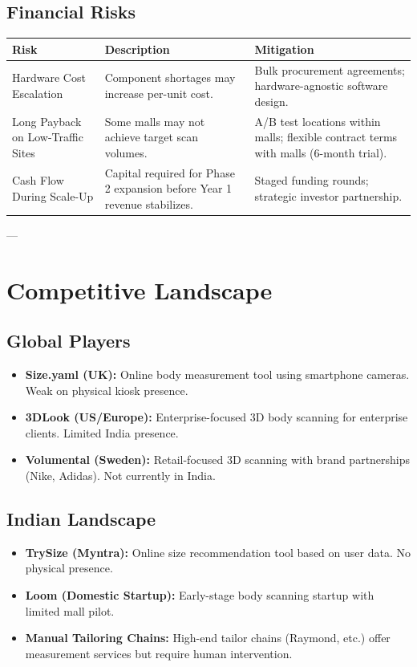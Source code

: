 \documentclass[12pt,a4paper]{article}
\begin{document}
\subsection{Financial Risks}

\begin{tabular}{lp{6cm}p{3cm}}
\toprule
Risk & Description & Mitigation \\
\midrule
Hardware Cost Escalation & Component shortages may increase per-unit cost. & Bulk procurement agreements; hardware-agnostic software design. \\
Long Payback on Low-Traffic Sites & Some malls may not achieve target scan volumes. & A/B test locations within malls; flexible contract terms with malls (6-month trial). \\
Cash Flow During Scale-Up & Capital required for Phase 2 expansion before Year 1 revenue stabilizes. & Staged funding rounds; strategic investor partnership. \\
\midrule
\end{tabular}

---

\section{Competitive Landscape}

\subsection{Global Players}

\begin{itemize}
    \item \textbf{Size.yaml (UK):} Online body measurement tool using smartphone cameras. Weak on physical kiosk presence.
    \item \textbf{3DLook (US/Europe):} Enterprise-focused 3D body scanning for enterprise clients. Limited India presence.
    \item \textbf{Volumental (Sweden):} Retail-focused 3D scanning with brand partnerships (Nike, Adidas). Not currently in India.
\end{itemize}

\subsection{Indian Landscape}

\begin{itemize}
    \item \textbf{TrySize (Myntra):} Online size recommendation tool based on user data. No physical presence.
    \item \textbf{Loom (Domestic Startup):} Early-stage body scanning startup with limited mall pilot.
    \item \textbf{Manual Tailoring Chains:} High-end tailor chains (Raymond, etc.) offer measurement services but require human intervention.
\end{itemize}
\end{document}
